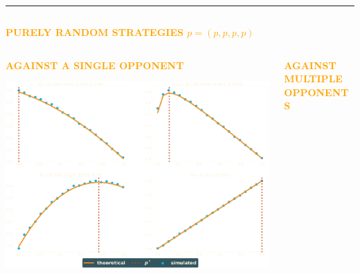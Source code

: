 \documentclass[usenames,dvipsnames,t]{beamer}
\begin{document}
\hrule height 3pt
\vspace{1cm}
\begin{columns}
    \begin{column}{.7\linewidth}
        \begin{center}
            \textcolor{orange}{\textbf{\Large{PURELY RANDOM STRATEGIES \(p=(p, p, p, p)\)}}}
        \end{center}

    \begin{columns}
        \begin{column}{.5\linewidth}
            \begin{center}
            \vspace{-1cm}

            \textcolor{orange}{\textbf{\small{AGAINST A SINGLE OPPONENT}}}
            \vspace{2cm}

            
            \vspace{2cm}

            \includegraphics[width=.7\textwidth]{static/matches}
            \end{center}
        \end{column}
        \begin{column}{.5\linewidth}
            \begin{center}
                \vspace{-1cm}
    
                \textcolor{orange}{\textbf{\small{AGAINST MULTIPLE OPPONENTS}}}
                \vspace{2cm}
    
                
                \vspace{1.5cm}
                

\end{center}
\end{column}
\end{columns}
\end{column}
\end{columns}
\end{document}
